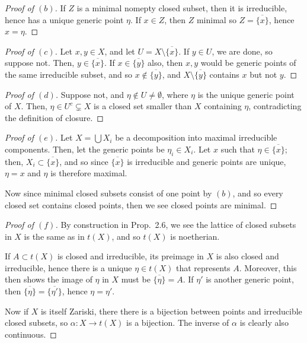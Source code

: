 \documentclass[12pt,letterpaper]{article}
\theoremstyle{definition}
\theoremstyle{remark}
\numberwithin{equation}{section}
\numberwithin{figure}{problem}
\begin{document}
\begin{proof}[Proof of $(b)$]
  If $Z$ is a minimal nomepty closed subset, then it is irreducible, hence has a unique generic point $\eta$. If $x \in Z$, then $Z$ minimal so $Z = \overline{\{x\}}$, hence $x = \eta$.
\end{proof}
\begin{proof}[Proof of $(c)$]
  Let $x,y \in X$, and let $U = X \setminus \overline{\{x\}}$. If $y \in U$, we are done, so suppose not. Then, $y \in \overline{\{x\}}$. If $x \in \overline{\{y\}}$ also, then $x,y$ would be generic points of the same irreducible subset, and so $x \notin \overline{\{y\}}$, and $X \setminus \overline{\{y\}}$ contains $x$ but not $y$.
\end{proof}
\begin{proof}[Proof of $(d)$]
  Suppose not, and $\eta \notin U \ne \emptyset$, where $\eta$ is the unique generic point of $X$. Then, $\eta \in U^c \subsetneq X$ is a closed set smaller than $X$ containing $\eta$, contradicting the definition of closure.
\end{proof}
\begin{proof}[Proof of $(e)$]
  Let $X = \bigcup X_i$ be a decomposition into maximal irreducible components. Then, let the generic points be $\eta_i \in X_i$. Let $x$ such that $\eta \in \overline{\{x\}}$; then, $X_i \subset \overline{\{x\}}$, and so since $\overline{\{x\}}$ is irreducible and generic points are unique, $\eta = x$ and $\eta$ is therefore maximal.
  \par Now since minimal closed subsets consist of one point by $(b)$, and so every closed set contains closed points, then we see closed points are minimal.
\end{proof}
\begin{proof}[Proof of $(f)$]
  By construction in Prop.~2.6, we see the lattice of closed subsets in $X$ is the same as in $t(X)$, and so $t(X)$ is noetherian.
  \par If $A \subset t(X)$ is closed and irreducible, its preimage in $X$ is also closed and irreducible, hence there is a unique $\eta \in t(X)$ that represents $A$. Moreover, this then shows the image of $\eta$ in $X$ must be $\overline{\{\eta\}} = A$. If $\eta'$ is another generic point, then $\overline{\{\eta\}} = \overline{\{\eta'\}}$, hence $\eta = \eta'$.
  \par Now if $X$ is itself Zariski, there there is a bijection between points and irreducible closed subsets, so $\alpha\colon X \to t(X)$ is a bijection. The inverse of $\alpha$ is clearly also continuous.
\end{proof}
\end{document}
